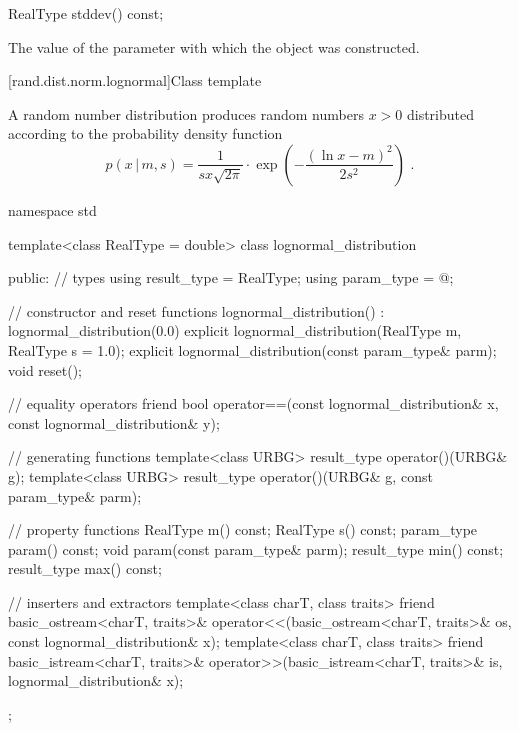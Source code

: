 %
\begin{itemdecl}
RealType stddev() const;
\end{itemdecl}

\begin{itemdescr}
\pnum
\returns
The value of the  parameter
 with which the object was constructed.
\end{itemdescr}


[rand.dist.norm.lognormal]{Class template }%
%

\pnum
A  random number distribution
produces random numbers $x > 0$
distributed according to
the probability density function%
\[ p(x\,|\,m,s) = \frac{1}{s x \sqrt{2 \pi}}
     \cdot \exp{\left(-\frac{(\ln{x} - m)^2}{2 s^2}\right)}
     \text{ .} \]

%
%
\begin{codeblock}
namespace std {
  template<class RealType = double>
  class lognormal_distribution {
  public:
    // types
    using result_type = RealType;
    using param_type  = @\unspec@;

    // constructor and reset functions
    lognormal_distribution() : lognormal_distribution(0.0) {}
    explicit lognormal_distribution(RealType m, RealType s = 1.0);
    explicit lognormal_distribution(const param_type& parm);
    void reset();

    // equality operators
    friend bool operator==(const lognormal_distribution& x, const lognormal_distribution& y);

    // generating functions
    template<class URBG>
      result_type operator()(URBG& g);
    template<class URBG>
      result_type operator()(URBG& g, const param_type& parm);

    // property functions
    RealType m() const;
    RealType s() const;
    param_type param() const;
    void param(const param_type& parm);
    result_type min() const;
    result_type max() const;

    // inserters and extractors
    template<class charT, class traits>
      friend basic_ostream<charT, traits>&
        operator<<(basic_ostream<charT, traits>& os, const lognormal_distribution& x);
    template<class charT, class traits>
      friend basic_istream<charT, traits>&
        operator>>(basic_istream<charT, traits>& is, lognormal_distribution& x);
  };
}
\end{codeblock}


